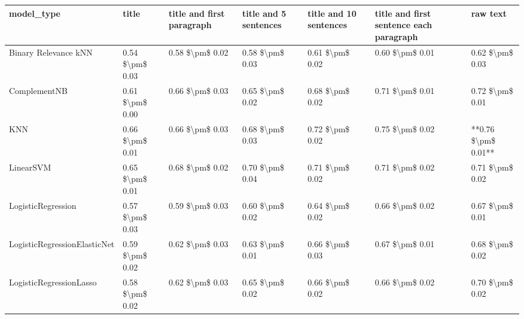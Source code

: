 \begin{tabular}{lllllll}
\toprule
                     model\_type &               title & title and first paragraph & title and 5 sentences & title and 10 sentences & title and first sentence each paragraph &            raw text \\
\midrule
           Binary Relevance kNN &     0.54 \$\textbackslash pm\$ 0.03 &           0.58 \$\textbackslash pm\$ 0.02 &       0.58 \$\textbackslash pm\$ 0.03 &        0.61 \$\textbackslash pm\$ 0.02 &                         0.60 \$\textbackslash pm\$ 0.01 &     0.62 \$\textbackslash pm\$ 0.03 \\
                   ComplementNB &     0.61 \$\textbackslash pm\$ 0.00 &           0.66 \$\textbackslash pm\$ 0.03 &       0.65 \$\textbackslash pm\$ 0.02 &        0.68 \$\textbackslash pm\$ 0.02 &                         0.71 \$\textbackslash pm\$ 0.01 &     0.72 \$\textbackslash pm\$ 0.01 \\
                            KNN &     0.66 \$\textbackslash pm\$ 0.01 &           0.66 \$\textbackslash pm\$ 0.03 &       0.68 \$\textbackslash pm\$ 0.03 &        0.72 \$\textbackslash pm\$ 0.02 &                         0.75 \$\textbackslash pm\$ 0.02 & **0.76 \$\textbackslash pm\$ 0.01** \\
                      LinearSVM &     0.65 \$\textbackslash pm\$ 0.01 &           0.68 \$\textbackslash pm\$ 0.02 &       0.70 \$\textbackslash pm\$ 0.04 &        0.71 \$\textbackslash pm\$ 0.02 &                         0.71 \$\textbackslash pm\$ 0.02 &     0.71 \$\textbackslash pm\$ 0.02 \\
             LogisticRegression &     0.57 \$\textbackslash pm\$ 0.03 &           0.59 \$\textbackslash pm\$ 0.03 &       0.60 \$\textbackslash pm\$ 0.02 &        0.64 \$\textbackslash pm\$ 0.02 &                         0.66 \$\textbackslash pm\$ 0.02 &     0.67 \$\textbackslash pm\$ 0.01 \\
   LogisticRegressionElasticNet &     0.59 \$\textbackslash pm\$ 0.02 &           0.62 \$\textbackslash pm\$ 0.03 &       0.63 \$\textbackslash pm\$ 0.01 &        0.66 \$\textbackslash pm\$ 0.03 &                         0.67 \$\textbackslash pm\$ 0.01 &     0.68 \$\textbackslash pm\$ 0.02 \\
        LogisticRegressionLasso &     0.58 \$\textbackslash pm\$ 0.02 &           0.62 \$\textbackslash pm\$ 0.03 &       0.65 \$\textbackslash pm\$ 0.02 &        0.66 \$\textbackslash pm\$ 0.02 &                         0.66 \$\textbackslash pm\$ 0.02 &     0.70 \$\textbackslash pm\$ 0.02 \\

\end{tabular}
